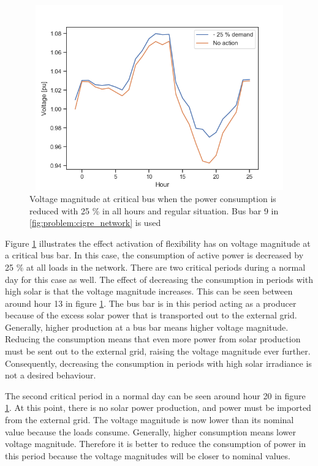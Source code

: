 \documentclass[class=book, crop=false]{standalone}
\begin{document}
\begin{figure}[h]
    \center
\includegraphics[height=8cm, width=12cm]{figures/decrease_demand_voltage.png}
    \caption[size = 9]{Voltage magnitude at critical bus when the power consumption is reduced with 25 \% in all hours and regular situation. Bus bar 9 in \ref{fig:problem:cigre_network} is used}
    \label{fig:results:decrease_demand_voltage}
\end{figure}

Figure \ref{fig:results:decrease_demand_voltage} illustrates the effect activation of flexibility has on voltage magnitude at a critical bus bar. In this case, the consumption of active power is decreased by 25 \% at all loads in the network. There are two critical periods during a normal day for this case as well. The effect of decreasing the consumption in periods with high solar is that the voltage magnitude increases. This can be seen between around hour 13 in figure \ref{fig:results:decrease_demand_voltage}. The bus bar is in this period acting as a producer because of the excess solar power that is transported out to the external grid. Generally, higher production at a bus bar means higher voltage magnitude. Reducing the consumption means that even more power from solar production must be sent out to the external grid, raising the voltage magnitude ever further. Consequently, decreasing the consumption in periods with high solar irradiance is not a desired behaviour. 


The second critical period in a normal day can be seen around hour 20 in figure \ref{fig:results:decrease_demand_voltage}. At this point, there is no solar power production, and power must be imported from the external grid. The voltage magnitude is now lower than its nominal value because the loads consume. Generally, higher consumption means lower voltage magnitude. Therefore it is better to reduce the consumption of power in this period because the voltage magnitudes will be closer to nominal values.
\end{document}

